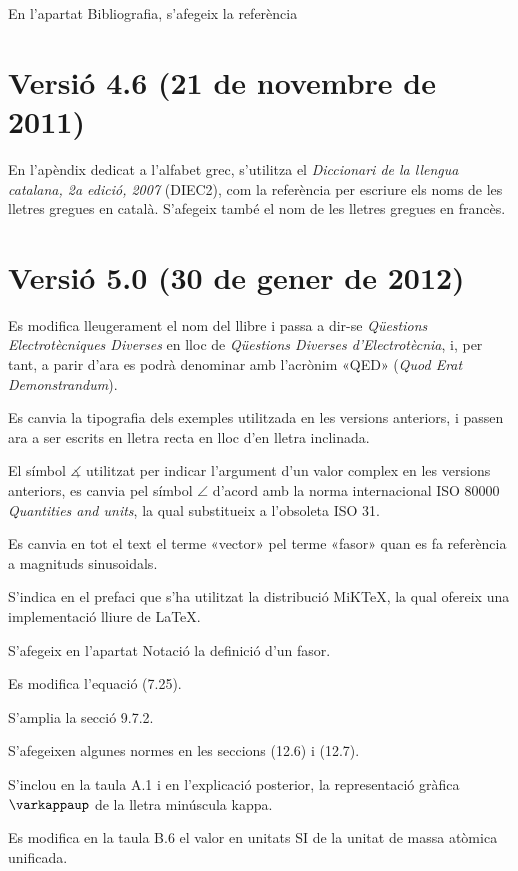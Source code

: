 En l'apartat Bibliografia, s'afegeix la referència \cite{RJB}


\section*{Versió 4.6 (21 de novembre de 2011)}

En l'apèndix dedicat a l'alfabet grec, s'utilitza el \textit{Diccionari de la llengua catalana, 2a edició, 2007} (DIEC2), com la referència per escriure els noms de les lletres gregues en català. S'afegeix també el nom de les lletres gregues en francès.


\section*{Versió 5.0 (30 de gener de 2012)}

Es modifica lleugerament el nom del llibre i  passa a dir-se \textit{Qüestions Electrotècniques Diverses} en lloc de \textit{Qüestions Diverses d'Electrotècnia}, i, per tant, a parir d'ara es podrà denominar amb l'acrònim «QED» (\emph{Quod Erat Demonstrandum}).

Es canvia la tipografia dels exemples utilitzada en les versions anteriors, i passen ara a ser escrits en lletra recta en lloc d'en lletra inclinada.

El símbol $\measuredangle$ utilitzat per indicar l'argument d'un valor complex en les versions anteriors, es canvia pel símbol $\angle$ d'acord amb la norma internacional ISO 80000 \textit{Quantities and units}, la qual substitueix a l'obsoleta ISO 31.

Es canvia en tot el text el terme «vector» pel terme «fasor» quan es fa referència a magnituds sinusoidals.

S'indica en el prefaci que s'ha utilitzat la distribució MiK\TeX, la qual ofereix una implementació lliure de \LaTeX.

S'afegeix en l'apartat Notació la definició d'un fasor.

Es modifica l'equació (7.25).

S'amplia la secció 9.7.2.

S'afegeixen algunes normes en les seccions (12.6) i (12.7).

S'inclou en la taula A.1 i en l'explicació posterior, la representació gràfica $\varkappaup$ de la lletra minúscula kappa.

Es modifica en la taula B.6 el valor en unitats SI de la unitat de massa atòmica unificada.

